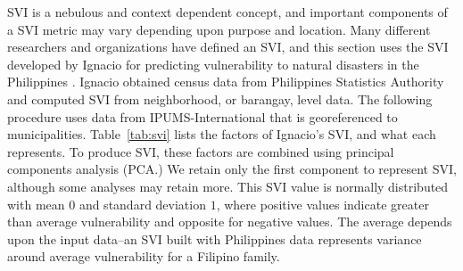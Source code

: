 \documentclass[]{interact}
\theoremstyle{plain}%
\theoremstyle{definition}
\theoremstyle{remark}
\begin{document}
SVI is a nebulous and context dependent concept, and important components of a SVI metric may vary depending upon purpose and location.  Many different researchers and organizations have defined an SVI, and this section uses the SVI developed by Ignacio for predicting vulnerability to natural disasters in the Philippines \citep{ignacio15}.  Ignacio obtained census data from Philippines Statistics Authority and computed SVI from neighborhood, or barangay, level data.  The following procedure uses data from IPUMS-International \citep{ipumsi} that is georeferenced to municipalities.  Table~\ref{tab:svi} lists the factors of Ignacio's SVI, and what each represents.  To produce SVI, these factors are combined using principal components analysis (PCA.)  We retain only the first component to represent SVI, although some analyses may retain more.  This SVI value is normally distributed with mean $0$ and standard deviation $1$, where positive values indicate greater than average vulnerability and opposite for negative values.  The average depends upon the input data--an SVI built with Philippines data represents variance around average vulnerability for a Filipino family.
\end{document}
